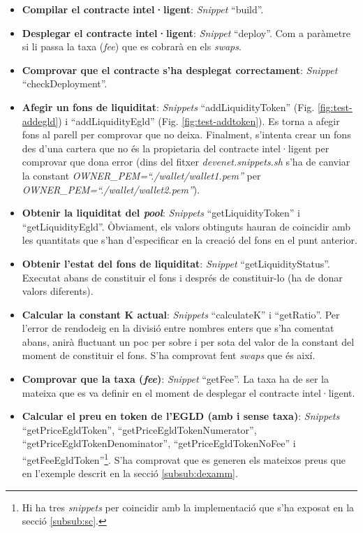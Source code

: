 \documentclass[11pt,a4paper]{article}
\begin{document}
\begin{itemize}
\item \textbf{Compilar el contracte intel·ligent}: \textit{Snippet} ``build''.
\item \textbf{Desplegar el contracte intel·ligent}: \textit{Snippet} ``deploy''. Com a paràmetre si li passa la taxa (\textit{fee}) que es cobrarà en els \textit{swaps}.
\item \textbf{Comprovar que el contracte s'ha desplegat correctament}: \textit{Snippet} ``checkDeployment''.
\item \textbf{Afegir un fons de liquiditat}: \textit{Snippets} ``addLiquidityToken'' (Fig. \ref{fig:test-addegld}) i ``addLiquidityEgld'' (Fig. \ref{fig:test-addtoken}). Es torna a afegir fons al parell per comprovar que no deixa. Finalment, s'intenta crear un fons des d'una cartera que no és la propietaria del contracte intel·ligent per comprovar que dona error (dins del fitxer \textit{devenet.snippets.sh} s'ha de canviar la constant \textit{OWNER\_PEM=``./wallet/wallet1.pem''} per \textit{OWNER\_PEM=``./wallet/wallet2.pem''}).
\item \textbf{Obtenir la liquiditat del \textit{pool}}: \textit{Snippets} ``getLiquidityToken'' i ``getLiquidityEgld''. Òbviament, els valors obtinguts hauran de coincidir amb les quantitats que s'han d'especificar en la creació del fons en el punt anterior.
\item \textbf{Obtenir l'estat del fons de liquiditat}: \textit{Snippet} ``getLiquidityStatus''. Executat abans de constituir el fons i després de constituir-lo (ha de donar valors diferents).
\item \textbf{Calcular la constant K actual}: \textit{Snippets} ``calculateK'' i ``getRatio''. Per l'error de rendodeig en la divisió entre nombres enters que s'ha comentat abans, anirà fluctuant un poc per sobre i per sota del valor de la constant del moment de constituir el fons. S'ha comprovat fent \textit{swaps} que és així.
\item \textbf{Comprovar que la taxa (\textit{fee})}: \textit{Snippet} ``getFee''. La taxa ha de ser la mateixa que es va definir en el moment de desplegar el contracte intel·ligent. 
\item \textbf{Calcular el preu en token de l'EGLD (amb i sense taxa)}: \textit{Snippets} ``getPriceEgldToken'', ``getPriceEgldTokenNumerator'', ``getPriceEgldTokenDenominator'', ``getPriceEgldTokenNoFee'' i ``getFeeEgldToken''\footnote{\label{note1}Hi ha tres \textit{snippets} per coincidir amb la implementació que s'ha exposat en la secció \ref{subsub:sc}.}. S'ha comprovat que es generen els mateixos preus que en l'exemple descrit en la secció \ref{subsub:dexamm}.

\end{itemize}
\end{document}
